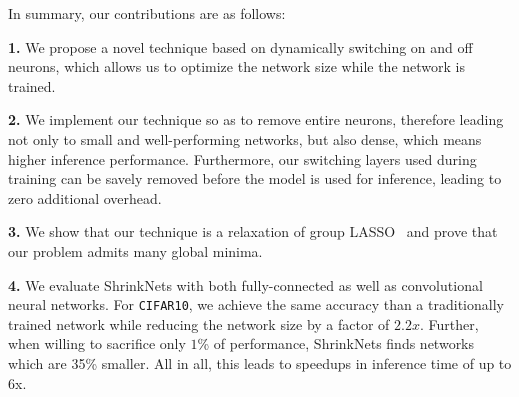 In summary, our contributions are as follows: 


\noindent\textbf{1.} We propose a novel technique based on dynamically switching
on and off neurons, which allows us to optimize the network size while the
network is trained. 

\noindent\textbf{2.} We implement our technique so as to remove entire neurons,
therefore leading not only to small and well-performing networks, but also
dense, which means higher inference performance. Furthermore, our switching
layers used during training can be savely removed before the model is used for
inference, leading to zero additional overhead. 


\noindent\textbf{3.} We show that our technique is a relaxation of group
LASSO~\cite{Yuan2006} and prove that our problem admits many global minima.

\noindent\textbf{4.} We evaluate ShrinkNets with both fully-connected as well as
convolutional neural networks. For \texttt{CIFAR10}, we achieve the same
accuracy than a traditionally trained network while reducing the network size by
a factor of $2.2x$. Further, when willing to sacrifice only $1$\% of
performance, ShrinkNets finds networks which are 35\% smaller. All in all, this
leads to speedups in inference time of up to 6x. 



